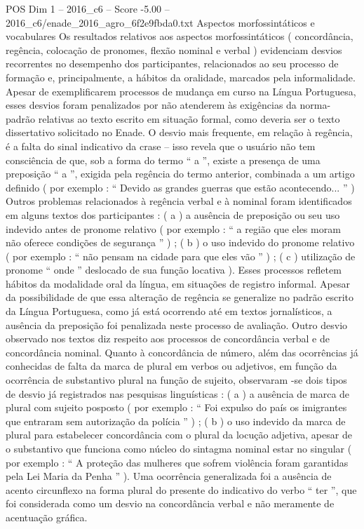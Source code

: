 \begin{textsample}{POS Dim 1 – 2016\_c6 – Score -5.00 – 2016\_c6/enade\_2016\_agro\_6f2e9fbda0.txt}
Aspectos morfossintáticos e vocabulares Os resultados relativos aos aspectos morfossintáticos ( concordância, regência, colocação de pronomes, flexão nominal e verbal ) evidenciam desvios recorrentes no desempenho dos participantes, relacionados ao seu processo de formação e, principalmente, a hábitos da oralidade, marcados pela informalidade.
Apesar de exemplificarem processos de mudança em curso na Língua Portuguesa, esses desvios foram penalizados por não atenderem às exigências da norma-padrão relativas ao texto escrito em situação formal, como deveria ser o texto dissertativo solicitado no Enade.
O desvio mais frequente, em relação à regência, é a falta do sinal indicativo da crase – isso revela que o usuário não tem consciência de que, sob a forma do termo “ a ”, existe a presença de uma preposição “ a ”, exigida pela regência do termo anterior, combinada a um artigo definido ( por exemplo : “ Devido as grandes guerras que estão acontecendo... ” ) Outros problemas relacionados à regência verbal e à nominal foram identificados em alguns textos dos participantes : ( a ) a ausência de preposição ou seu uso indevido antes de pronome relativo ( por exemplo : “ a região que eles moram não oferece condições de segurança ” ) ; ( b ) o uso indevido do pronome relativo ( por exemplo : “ não pensam na cidade para que eles vão ” ) ; ( c ) utilização de pronome “ onde ” deslocado de sua função locativa ).
Esses processos refletem hábitos da modalidade oral da língua, em situações de registro informal.
Apesar da possibilidade de que essa alteração de regência se generalize no padrão escrito da Língua Portuguesa, como já está ocorrendo até em textos jornalísticos, a ausência da preposição foi penalizada neste processo de avaliação.
Outro desvio observado nos textos diz respeito aos processos de concordância verbal e de concordância nominal.
Quanto à concordância de número, além das ocorrências já conhecidas de falta da marca de plural em verbos ou adjetivos, em função da ocorrência de substantivo plural na função de sujeito, observaram -se dois tipos de desvio já registrados nas pesquisas linguísticas : ( a ) a ausência de marca de plural com sujeito posposto ( por exemplo : “ Foi expulso do país os imigrantes que entraram sem autorização da polícia ” ) ; ( b ) o uso indevido da marca de plural para estabelecer concordância com o plural da locução adjetiva, apesar de o substantivo que funciona como núcleo do sintagma nominal estar no singular ( por exemplo : “ A proteção das mulheres que sofrem violência foram garantidas pela Lei Maria da Penha ” ).
Uma ocorrência generalizada foi a ausência de acento circunflexo na forma plural do presente do indicativo do verbo “ ter ”, que foi considerada como um desvio na concordância verbal e não meramente de acentuação gráfica.

\end{textsample}
